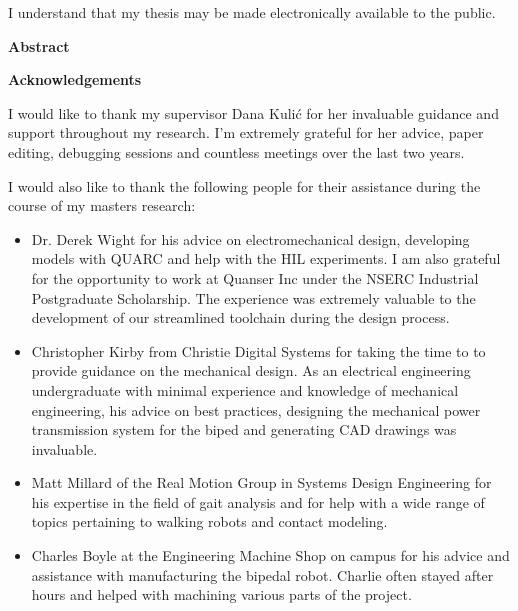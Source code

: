 \bigskip
  
\noindent
I understand that my thesis may be made electronically available to the public.

\cleardoublepage


\begin{center}
    \textbf{Abstract}
\end{center}


\cleardoublepage


\begin{center}
    \textbf{Acknowledgements}
\end{center}

I would like to thank my supervisor Dana Kuli\'{c} for her invaluable guidance and support throughout my research. I'm extremely grateful for her advice, paper editing, debugging sessions and countless meetings over the last two years.  

I would also like to thank the following people for their assistance during the course of my masters research: 

\begin{itemize}
    \item Dr. Derek Wight for his advice on electromechanical design, developing models with QUARC and help with the HIL experiments. I am also grateful for the opportunity to work at Quanser Inc under the NSERC Industrial Postgraduate Scholarship. The experience was extremely valuable to the development of our streamlined toolchain during the design process. \\

    \item Christopher Kirby from Christie Digital Systems for taking the time to to provide guidance on the mechanical design. As an electrical engineering undergraduate with minimal experience and knowledge of mechanical engineering, his advice on best  practices, designing the mechanical power transmission system for the biped and generating CAD drawings was invaluable. \\

    \item Matt Millard of the Real Motion Group in Systems Design Engineering for his expertise in the field of gait analysis and for help with a wide range of topics pertaining to walking robots and contact modeling.  \\

    \item Charles Boyle at the Engineering Machine Shop on campus for his advice and assistance with manufacturing the bipedal robot. Charlie often stayed after hours and helped with machining various parts of the project.  \\

\end{itemize}

